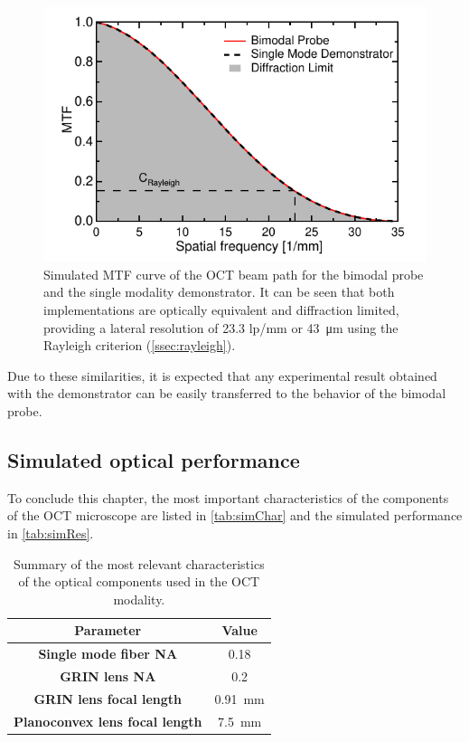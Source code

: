 \begin{figure}[h!]\centering
      \includegraphics{figures/30_DesignSimulation/Optical/MTF/MTFComparison.pdf}
      \caption{Simulated MTF curve of the OCT beam path for the bimodal probe and the single modality demonstrator. It can be seen that both implementations are optically equivalent and diffraction limited, providing a lateral resolution of 23.3 lp/mm or \SI{43}{\micro\meter} using the Rayleigh criterion (\autoref{ssec:rayleigh}).}
      \label{fig:MTFcomp}
\end{figure}

Due to these similarities, it is expected that any experimental result obtained with the demonstrator can be easily transferred to the behavior of the bimodal probe.

\subsection{Simulated optical performance}

To conclude this chapter, the most important characteristics of the components of the OCT microscope are listed in \autoref{tab:simChar} and the simulated performance in \autoref{tab:simRes}.

\begin{table}[h!]\centering
	\caption{Summary of the most relevant characteristics of the optical components used in the OCT modality.}
	\begin{tabular}{cc}\\
		\textbf{Parameter} & \textbf{Value} \\ 		
		\hline
     	\textbf{Single mode fiber NA} & 0.18 \\ 
		\textbf{GRIN lens NA} & 0.2 \\ 
		\textbf{GRIN lens focal length} & \SI{0.91}{\milli\meter} \\ 
		\textbf{Planoconvex lens focal length} & \SI{7.5}{\milli\meter} \\ 
		\hline
	\end{tabular}
\label{tab:simChar}
\end{table}

